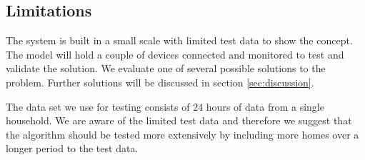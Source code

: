 \subsection{Limitations}
The system is built in a small scale with limited test data to show the concept. The model will hold a couple of devices connected and monitored to test and validate the solution. We evaluate one of several possible solutions to the problem. Further solutions will be discussed in section \ref{sec:discussion}.

The data set we use for testing consists of 24 hours of data from a single household. We are aware of the limited test data and therefore we suggest that the algorithm should be tested more extensively by including more homes over a longer period to the test data.
